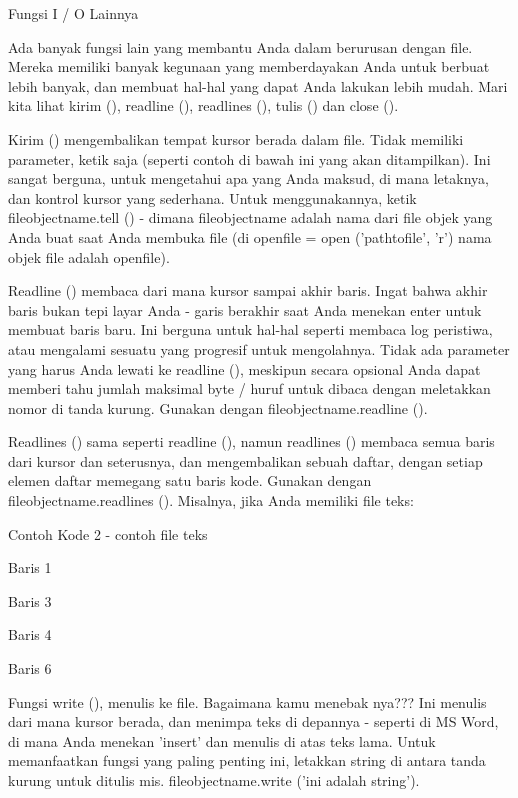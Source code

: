 \vspace{12pt}
Fungsi I / O Lainnya \par
\vspace{12pt}
Ada banyak fungsi lain yang membantu Anda dalam berurusan dengan file. Mereka memiliki banyak kegunaan yang memberdayakan Anda untuk berbuat lebih banyak, dan membuat hal-hal yang dapat Anda lakukan lebih mudah. Mari kita lihat kirim (), readline (), readlines (), tulis () dan close (). \par
\vspace{12pt}
Kirim () mengembalikan tempat kursor berada dalam file. Tidak memiliki parameter, ketik saja (seperti contoh di bawah ini yang akan ditampilkan). Ini sangat berguna, untuk mengetahui apa yang Anda maksud, di mana letaknya, dan kontrol kursor yang sederhana. Untuk menggunakannya, ketik fileobjectname.tell () - dimana fileobjectname adalah nama dari file objek yang Anda buat saat Anda membuka file (di openfile = open ('pathtofile', 'r') nama objek file adalah openfile). \par
\vspace{12pt}
Readline () membaca dari mana kursor sampai akhir baris. Ingat bahwa akhir baris bukan tepi layar Anda - garis berakhir saat Anda menekan enter untuk membuat baris baru. Ini berguna untuk hal-hal seperti membaca log peristiwa, atau mengalami sesuatu yang progresif untuk mengolahnya. Tidak ada parameter yang harus Anda lewati ke readline (), meskipun secara opsional Anda dapat memberi tahu jumlah maksimal byte / huruf untuk dibaca dengan meletakkan nomor di tanda kurung. Gunakan dengan fileobjectname.readline (). \par
\vspace{12pt}
Readlines () sama seperti readline (), namun readlines () membaca semua baris dari kursor dan seterusnya, dan mengembalikan sebuah daftar, dengan setiap elemen daftar memegang satu baris kode. Gunakan dengan fileobjectname.readlines (). Misalnya, jika Anda memiliki file teks: \par
Contoh Kode 2 - contoh file teks \par
\vspace{12pt}
Baris 1 \par
\vspace{12pt}
Baris 3 \par
Baris 4 \par
\vspace{12pt}
Baris 6 \par
\vspace{12pt}
Fungsi write (), menulis ke file. Bagaimana kamu menebak nya??? Ini menulis dari mana kursor berada, dan menimpa teks di depannya - seperti di MS Word, di mana Anda menekan 'insert' dan menulis di atas teks lama. Untuk memanfaatkan fungsi yang paling penting ini, letakkan string di antara tanda kurung untuk ditulis mis. fileobjectname.write ('ini adalah string'). \par
